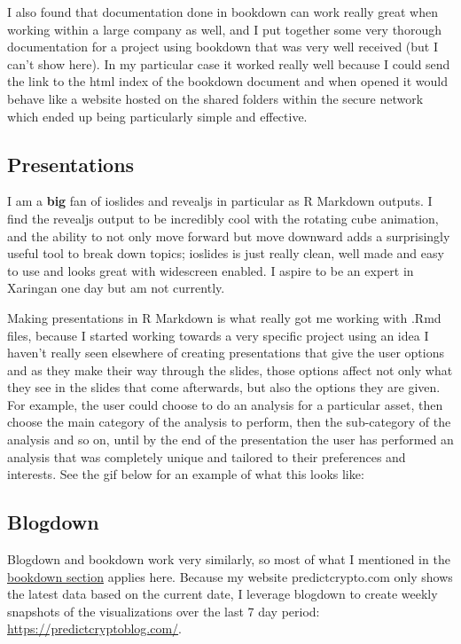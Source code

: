 \documentclass[
]{book}
\begin{document}
I also found that documentation done in bookdown can work really great when working within a large company as well, and I put together some very thorough documentation for a project using bookdown that was very well received (but I can't show here). In my particular case it worked really well because I could send the link to the html index of the bookdown document and when opened it would behave like a website hosted on the shared folders within the secure network which ended up being particularly simple and effective.

\hypertarget{presentations}{%
\subsection{Presentations}\label{presentations}}

I am a \textbf{big} fan of ioslides and revealjs in particular as R Markdown outputs. I find the revealjs output to be incredibly cool with the rotating cube animation, and the ability to not only move forward but move downward adds a surprisingly useful tool to break down topics; ioslides is just really clean, well made and easy to use and looks great with widescreen enabled. I aspire to be an expert in Xaringan one day but am not currently.

Making presentations in R Markdown is what really got me working with .Rmd files, because I started working towards a very specific project using an idea I haven't really seen elsewhere of creating presentations that give the user options and as they make their way through the slides, those options affect not only what they see in the slides that come afterwards, but also the options they are given. For example, the user could choose to do an analysis for a particular asset, then choose the main category of the analysis to perform, then the sub-category of the analysis and so on, until by the end of the presentation the user has performed an analysis that was completely unique and tailored to their preferences and interests. See the gif below for an example of what this looks like:

\hypertarget{blogdown}{%
\subsection{Blogdown}\label{blogdown}}

Blogdown\citep{R-blogdown} and bookdown work very similarly, so most of what I mentioned in the \protect\hyperlink{bookdown}{bookdown section} applies here. Because my website predictcrypto.com only shows the latest data based on the current date, I leverage blogdown to create weekly snapshots of the visualizations over the last 7 day period: \url{https://predictcryptoblog.com/}.
\end{document}
